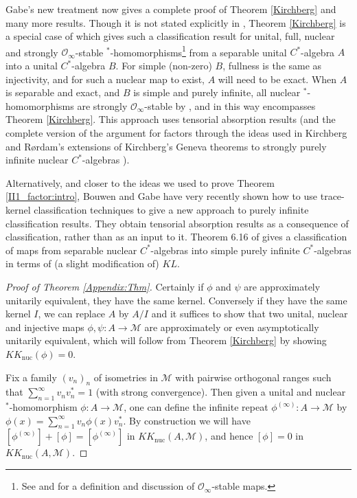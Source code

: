 \documentclass[reqno]{amsart}
\theoremstyle{definition}
\theoremstyle{remark}
\numberwithin{equation}{section}
\theoremstyle{definition}
\begin{document}
Gabe's new treatment \cite{Gabe:Crelle,Gabe:MAMS} now gives a complete proof of Theorem \ref{Kirchberg} and many more results. Though it is not stated explicitly in \cite{Gabe:MAMS}, Theorem \ref{Kirchberg} is a special case of \cite[Theorem B]{Gabe:MAMS} which gives such a classification result for unital, full, nuclear and strongly $\mathcal O_\infty$-stable $^*$-homomorphisms\footnote{See \cite[Section 3.3]{Gabe:Crelle} and \cite[Section 4]{Gabe:MAMS} for a definition and discussion of $\mathcal O_\infty$-stable maps.} from a separable unital $C^*$-algebra $A$ into a unital $C^*$-algebra $B$. For simple (non-zero) $B$, fullness is the same as injectivity, and for such a nuclear map to exist, $A$ will need to be exact. When $A$ is separable and exact, and $B$ is simple and purely infinite, all nuclear $^*$-homomorphisms are strongly $\mathcal O_\infty$-stable by \cite[Corollary 9.8]{Gabe:MAMS}, and in this way \cite[Theorem B]{Gabe:MAMS} encompasses Theorem \ref{Kirchberg}. This approach uses tensorial absorption results (and the complete version of the argument for \cite[Corollary 9.8]{Gabe:MAMS} factors through the ideas used in Kirchberg and R\o{}rdam's extensions of Kirchberg's Geneva theorems to strongly purely infinite nuclear $C^*$-algebras \cite{KR:Adv}).
 
 
Alternatively, and closer to the ideas we used to prove Theorem \ref{II1_factor:intro}, Bouwen and Gabe have very recently shown how to use trace-kernel classification techniques to give a new approach to purely infinite classification results.  They obtain tensorial absorption results as a consequence of classification, rather than as an input to it. Theorem 6.16 of \cite{Bouwen-Gabe-2024} gives a classification of maps from separable nuclear $C^*$-algebras into simple purely infinite $C^*$-algebras in terms of (a slight modification of) $KL$. 

\begin{proof}[Proof of Theorem \ref{Appendix:Thm}]
Certainly if $\phi$ and $\psi$ are approximately unitarily equivalent, they have the same kernel. Conversely if they have the same kernel $I$, we can replace $A$ by $A/I$ and it suffices to show that two unital, nuclear and injective maps $\phi,\psi:A\to\mathcal M$ are approximately or even asymptotically unitarily equivalent, which will follow from Theorem \ref{Kirchberg} by showing $KK_{\mathrm{nuc}}(\phi)=0$.

Fix a family $(v_n)_n$ of isometries in $\mathcal M$ with pairwise orthogonal ranges such that $\sum_{n=1}^\infty v_nv_n^*=1$ (with strong convergence). Then given a unital and nuclear $^*$-homomorphism $\phi:A\to\mathcal M$, one can define the infinite repeat $\phi^{(\infty)}:A\to \mathcal M$ by $\phi(x)=\sum_{n=1}^\infty v_n\phi(x)v_n^*$. By construction we will have $[\phi^{(\infty)}]+[\phi]=[\phi^{(\infty)}]$ in $KK_{\mathrm{nuc}}(A,\mathcal M)$, and hence $[\phi]=0$ in $KK_{\mathrm{nuc}}(A,\mathcal M)$.
\end{proof}
\end{document}
